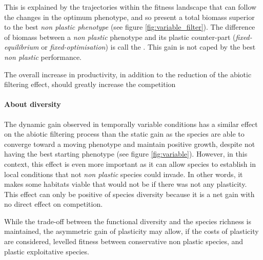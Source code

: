 This is explained by the trajectories within the fitness landscape that can follow the changes in the optimum phenotype, and so present a total biomass superior to the best \textit{non plastic phenotype} (see figure \ref{fig:variable_filter}). The difference of biomass between a \textit{non plastic} phenotype and its plastic counter-part (\textit{fixed-equilibrium} or \textit{fixed-optimisation}) is call the .  This gain is not caped by the best \textit{non plastic} performance.


The overall increase in productivity, in addition to the reduction of the abiotic filtering effect, should greatly increase the competition





\paragraph{About diversity}

The dynamic gain observed in temporally variable conditions has a similar effect on the abiotic filtering process than the static gain as the species are able to converge toward a moving phenotype and maintain positive growth, despite not having the best starting phenotype (see figure \ref{fig:variable}). However, in this context, this effect is even more important as it can allow species to establish in local conditions that not \textit{non plastic} species could invade. In other words, it makes some habitats viable that would not be if there was not any plasticity. This effect can only be positive of species diversity because it is a net gain with no direct effect on competition.

While the trade-off between the functional diversity and the species richness is maintained, the asymmetric gain of plasticity may allow, if the costs of plasticity are considered, levelled fitness between conservative non plastic species, and plastic exploitative species. %






